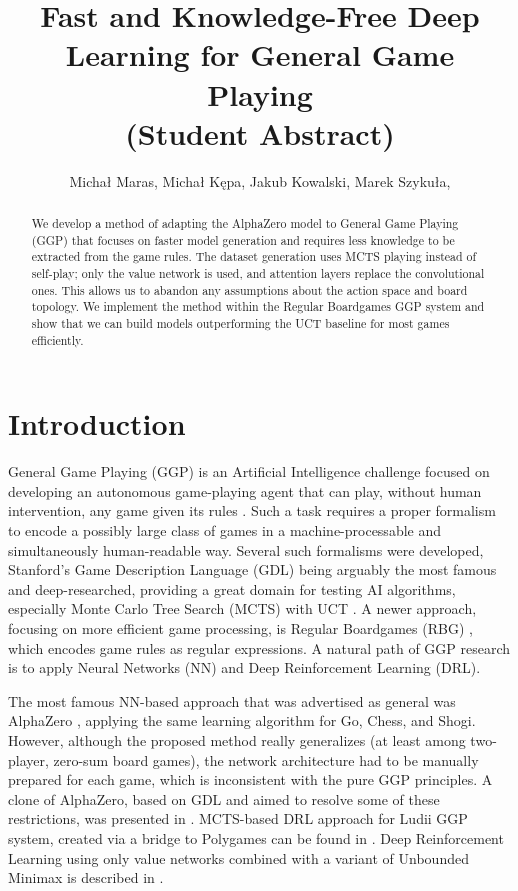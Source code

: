 \documentclass[letterpaper]{article} %
\title{Fast and Knowledge-Free Deep Learning for General Game Playing \\(Student Abstract)}
\author{
    Micha{\l} Maras, Micha{\l} K\k{e}pa, Jakub Kowalski, Marek Szyku{\l}a,
}
\begin{document}
\maketitle\begin{abstract}
We develop a method of adapting the AlphaZero model to General Game Playing (GGP) that focuses on faster model generation and requires less knowledge to be extracted from the game rules. The dataset generation uses MCTS playing instead of self-play; only the value network is used, and attention layers replace the convolutional ones. This allows us to abandon any assumptions about the action space and board topology. We implement the method within the Regular Boardgames GGP system and show that we can build models outperforming the UCT baseline for most games efficiently.
\end{abstract}

\section{Introduction}

General Game Playing (GGP) is an Artificial Intelligence challenge focused on developing an autonomous game-playing agent that can play, without human intervention, any game given its rules \cite{Genesereth2005General}.
Such a task requires a proper formalism to encode a possibly large class of games in a machine-processable and simultaneously human-readable way.
Several such formalisms were developed, Stanford's Game Description Language (GDL) \cite{Genesereth2005General} being arguably the most famous and deep-researched, providing a great domain for testing AI algorithms, especially Monte Carlo Tree Search (MCTS) with UCT \cite{Browne2012ASurvey}.
A newer approach, focusing on more efficient game processing, is Regular Boardgames (RBG) \cite{Kowalski2019RegularBoardgames}, which encodes game rules as regular expressions.
A natural path of GGP research is to apply Neural Networks (NN) and Deep Reinforcement Learning (DRL).

The most famous NN-based approach that was advertised as general was AlphaZero \cite{silver2018general}, applying the same learning algorithm for Go, Chess, and Shogi. However, although the proposed method really generalizes (at least among two-player, zero-sum board games), the network architecture had to be manually prepared for each game, which is inconsistent with the pure GGP principles.
A clone of AlphaZero, based on GDL and aimed to resolve some of these restrictions, was presented in \cite{ThielscherAAAI20}.
MCTS-based DRL approach for Ludii GGP system, created via a bridge to Polygames can be found in \cite{soemers2021deep}.
Deep Reinforcement Learning using only value networks combined with a variant of Unbounded Minimax is described in \cite{cohen2023minimax}.
\end{document}
